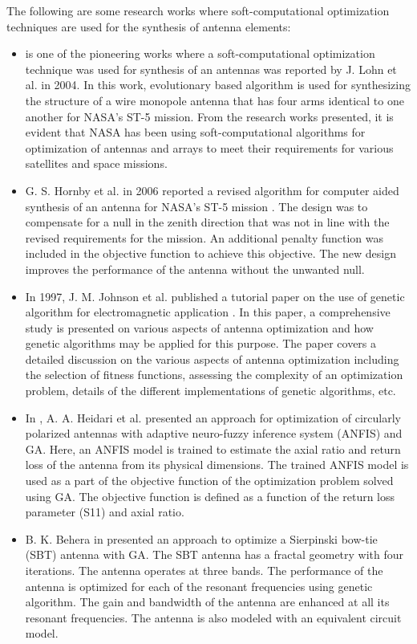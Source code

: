 The following are some research works where soft-computational optimization techniques are used for the synthesis of antenna elements:
\begin{itemize}
\item \cite{cadNASA2} is one of the pioneering works where a soft-computational optimization technique was used for synthesis of an antennas was reported by J. Lohn et al. in 2004. In this work, evolutionary based algorithm is used for synthesizing the structure of a wire monopole antenna that has four arms identical to one another for NASA's ST-5 mission. From the research works presented, it is evident that NASA has been using soft-computational algorithms for optimization of antennas and arrays to meet their requirements for various satellites and space missions.
\item G. S. Hornby et al. in 2006 reported a revised algorithm for computer aided synthesis of an antenna for NASA's ST-5 mission \cite{cadNASA}. The design was to compensate for a null in the zenith direction that was not in line with the revised requirements for the mission. An additional penalty function was included in the objective function to achieve this objective. The new design improves the performance of the antenna without the unwanted null.
\item In 1997, J. M. Johnson et al. published a tutorial paper on the use of genetic algorithm for electromagnetic application \cite{ga_em}. In this paper, a comprehensive study is presented on various aspects of antenna optimization and how genetic algorithms may be applied for this purpose. The paper covers a detailed discussion on the various aspects of antenna optimization including the selection of fitness functions, assessing the complexity of an optimization problem, details of the different implementations of genetic algorithms, etc.
\item In \cite{circpol_anfis_ga}, A. A. Heidari et al. presented an approach for optimization of circularly polarized antennas with adaptive neuro-fuzzy inference system (ANFIS) and GA. Here, an ANFIS model is trained to estimate the axial ratio and return loss of the antenna from its physical dimensions. The trained ANFIS model is used as a part of the objective function of the optimization problem solved using GA. The objective function is defined as a function of the return loss parameter (S11) and axial ratio.
\item B. K. Behera in \cite{fractal_bowtie_ga} presented an approach to optimize a Sierpinski bow-tie (SBT) antenna with GA. The SBT antenna has a fractal geometry with four iterations. The antenna operates at three bands. The performance of the antenna is optimized for each of the resonant frequencies using genetic algorithm. The gain and bandwidth of the antenna are enhanced at all its resonant frequencies. The antenna is also modeled with an equivalent circuit model.

\end{itemize}
